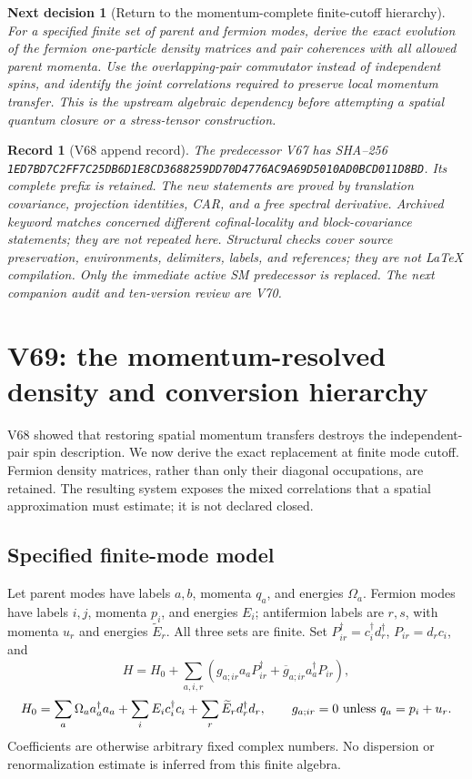\documentclass[11pt]{article}
\newtheorem{decision}[theorem]{Next decision}
\newtheorem{record}[theorem]{Record}
\theoremstyle{remark}
\begin{document}
\begin{decision}[Return to the momentum-complete finite-cutoff hierarchy]
\label{dec:v20v68-next}
For a specified finite set of parent and fermion modes,
derive the exact evolution of the fermion one-particle
density matrices and pair coherences with all allowed
parent momenta.  Use the overlapping-pair commutator
instead of independent spins, and identify the joint
correlations required to preserve local momentum
transfer.  This is the upstream algebraic dependency
before attempting a spatial quantum closure or a
stress-tensor construction.
\end{decision}

\begin{record}[V68 append record]
\label{rec:v20v68}
The predecessor V67 has SHA--256
\texttt{1ED7BD7C2FF7C25DB6D1E8CD3688259DD70D4776AC9A69D5010AD0BCD011D8BD}.
Its complete prefix is retained.  The new statements
are proved by translation covariance, projection
identities, CAR, and a free spectral derivative.
Archived keyword matches concerned different
cofinal-locality and block-covariance statements;
they are not repeated here.
Structural checks cover source preservation,
environments, delimiters, labels, and references;
they are not LaTeX compilation.
Only the immediate active SM predecessor is replaced.
The next companion audit and ten-version review are V70.
\end{record}


\section{V69: the momentum-resolved density and conversion hierarchy}
\label{sec:v20v69}

V68 showed that restoring spatial momentum transfers destroys
the independent-pair spin description.  We now derive the
exact replacement at finite mode cutoff.  Fermion density
matrices, rather than only their diagonal occupations, are
retained.  The resulting system exposes the mixed correlations
that a spatial approximation must estimate; it is not declared
closed.

\subsection{Specified finite-mode model}

Let parent modes have labels \(a,b\), momenta \(q_a\), and
energies \(\Omega_a\).  Fermion modes have labels \(i,j\),
momenta \(p_i\), and energies \(E_i\); antifermion labels
are \(r,s\), with momenta \(u_r\) and energies \(\widetilde E_r\).
All three sets are finite.  Set \(P_{ir}^\dagger=c_i^\dagger d_r^\dagger\),
\(P_{ir}=d_rc_i\), and
\[
 H=H_0+\sum_{a,i,r}
       (g_{a;ir}a_aP_{ir}^\dagger+
                         \overline g_{a;ir}a_a^\dagger P_{ir}),
\]
\[
 H_0=\sum_a\Omega_a a_a^\dagger a_a+
       \sum_iE_i c_i^\dagger c_i+
       \sum_r\widetilde E_r d_r^\dagger d_r,\qquad
 g_{a;ir}=0\ \hbox{unless }q_a=p_i+u_r.
\]
Coefficients are otherwise arbitrary fixed complex numbers.
No dispersion or renormalization estimate is inferred from
this finite algebra.
\end{document}
